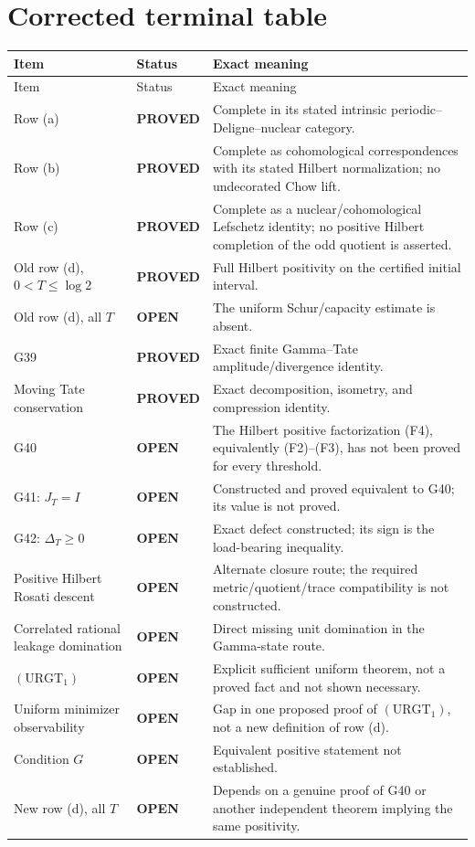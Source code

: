 \documentclass[11pt]{article}
\newcommand{\PROVED}{\textcolor{green!45!black}{\textbf{PROVED}}}
\newcommand{\OPEN}{\textcolor{red!70!black}{\textbf{OPEN}}}
\begin{document}
\section{Corrected terminal table}

\begin{longtable}{>{\raggedright\arraybackslash}p{}
                  >{\raggedright\arraybackslash}p{}
                  >{\raggedright\arraybackslash}p{}}
\toprule
Item & Status & Exact meaning \\
\midrule
\endfirsthead
\toprule
Item & Status & Exact meaning \\
\midrule
\endhead
Row (a) & \PROVED & Complete in its stated intrinsic
periodic--Deligne--nuclear category. \\
Row (b) & \PROVED & Complete as cohomological correspondences with its stated
Hilbert normalization; no undecorated Chow lift. \\
Row (c) & \PROVED & Complete as a nuclear/cohomological Lefschetz identity; no
positive Hilbert completion of the odd quotient is asserted. \\
Old row (d), \(0<T\leq\log2\) & \PROVED & Full Hilbert positivity on the certified
initial interval. \\
Old row (d), all \(T\) & \OPEN & The uniform Schur/capacity estimate is absent. \\
G39 & \PROVED & Exact finite Gamma--Tate amplitude/divergence identity. \\
Moving Tate conservation & \PROVED & Exact decomposition, isometry, and
compression identity. \\
G40 & \OPEN & The Hilbert positive factorization (F4), equivalently (F2)--(F3),
has not been proved for every threshold. \\
G41: \(J_T=I\) & \OPEN & Constructed and proved equivalent to G40; its value is
not proved. \\
G42: \(\Delta_T\geq0\) & \OPEN & Exact defect constructed; its sign is the
load-bearing inequality. \\
Positive Hilbert Rosati descent & \OPEN & Alternate closure route; the required
metric/quotient/trace compatibility is not constructed. \\
Correlated rational leakage domination & \OPEN & Direct missing unit domination
in the Gamma-state route. \\
\((\mathrm{URGT}_1)\) & \OPEN & Explicit sufficient uniform theorem, not a proved
fact and not shown necessary. \\
Uniform minimizer observability & \OPEN & Gap in one proposed proof of
\((\mathrm{URGT}_1)\), not a new definition of row (d). \\
Condition \(G\) & \OPEN & Equivalent positive statement not established. \\
New row (d), all \(T\) & \OPEN & Depends on a genuine proof of G40 or another
independent theorem implying the same positivity. \\
\bottomrule
\end{longtable}
\end{document}
